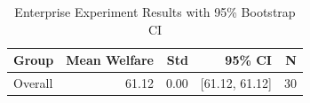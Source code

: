 \begin{table}[h]
\centering
\caption{Enterprise Experiment Results with 95\% Bootstrap CI}
\begin{tabular}{lrrrr}
\hline
Group & Mean Welfare & Std & 95\% CI & N \\
\hline
Overall & 61.12 & 0.00 & [61.12, 61.12] & 30 \\
\hline
\end{tabular}
\end{table}
